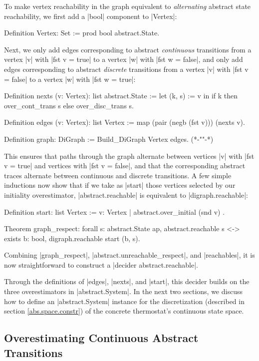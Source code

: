 \documentclass[runningheads]{llncs}
\begin{document}
{To make vertex reachability in the graph equivalent to \emph{alternating} abstract state reachability, we first add a |bool| component to |Vertex|:
\begin{code}
Definition Vertex: Set := prod bool abstract.State.
\end{code}
Next, we only add edges corresponding to abstract \emph{continuous} transitions from a vertex |v| with |fst v = true| to a vertex |w| with |fst w = false|, and only add edges corresponding to abstract \emph{discrete} transitions from a vertex |v| with |fst v = false| to a vertex |w| with |fst w = true|:

\begin{code}
  Definition nexts (v: Vertex): list abstract.State :=
    let (k, s) := v in
      if k then over_cont_trans s
      else over_disc_trans s.

  Definition edges (v: Vertex): list Vertex := map (pair (negb (fst v))) (nexts v).

  Definition graph: DiGraph := Build_DiGraph Vertex edges.
    (*{-""-}*)
\end{code}
This ensures that paths through the graph alternate between vertices |v| with |fst v = true| and vertices with |fst v = false|, and that the corresponding abstract traces alternate between continuous and discrete transitions. A few simple inductions now show that if we take as |start| those vertices selected by our initiality overestimator, |abstract.reachable| is equivalent to |digraph.reachable|:
\begin{code}
  Definition start: list Vertex := { v: Vertex | abstract.over_initial (snd v) }.

  Theorem graph_respect: forall s: abstract.State ap,
    abstract.reachable s <-> exists b: bool, digraph.reachable start (b, s).
\end{code}

Combining |graph_respect|, |abstract.unreachable_respect|, and |reachables|, it is now straightforward to construct a |decider abstract.reachable|.

Through the definitions of |edges|, |nexts|, and |start|, this decider builds on the three overestimators in |abstract.System|. In the next two sections, we discuss how to define an |abstract.System| instance for the discretization (described in section \ref{abs.space.constr}) of the concrete thermostat's continuous state space.
}

\subsection{Overestimating Continuous Abstract Transitions}
\label{over_cont_trans}
\end{document}
